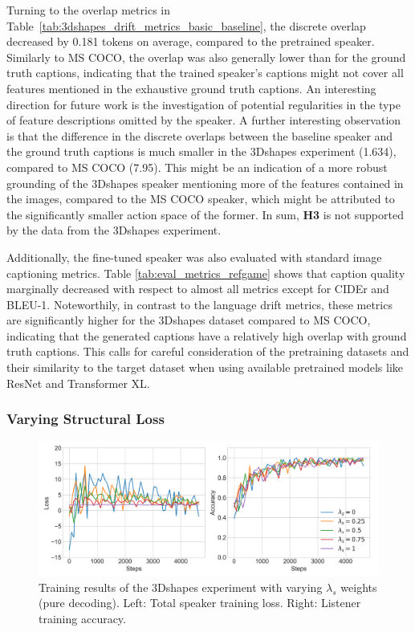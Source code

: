 Turning to the overlap metrics in Table~\ref{tab:3dshapes_drift_metrics_basic_baseline}, the discrete overlap decreased by 0.181 tokens on average, compared to the pretrained speaker. Similarly to MS COCO, the overlap was also generally lower than for the ground truth captions, indicating that the trained speaker's captions might not cover all features mentioned in the exhaustive ground truth captions. An interesting direction for future work is the investigation of potential regularities in the type of feature descriptions omitted by the speaker. A further interesting observation is that the difference in the discrete overlaps between the baseline speaker and the ground truth captions is much smaller in the 3Dshapes experiment (1.634), compared to MS COCO (7.95). This might be an indication of a more robust grounding of the 3Dshapes speaker mentioning more of the features contained in the images, compared to the MS COCO speaker, which might be attributed to the significantly smaller action space of the former. In sum, \textbf{H3} is not supported by the data from the 3Dshapes experiment.


Additionally, the fine-tuned speaker was also evaluated with standard image captioning metrics. Table \ref{tab:eval_metrics_refgame} shows that caption quality marginally decreased with respect to almost all metrics except for CIDEr and BLEU-1. Noteworthily, in contrast to the language drift metrics, these metrics are significantly higher for the 3Dshapes dataset compared to MS COCO, indicating that the generated captions have a relatively high overlap with ground truth captions. This calls for careful consideration of the pretraining datasets and their similarity to the target dataset when using available pretrained models like ResNet and Transformer XL.

\subsubsection{Varying Structural Loss}

\begin{figure}[h]
	\centering
	\includegraphics[width=\linewidth]{images/shapes_refgame_49_pure_losses_all_Ls_random.png}
	\caption{Training results of the 3Dshapes experiment with varying $\lambda_s$ weights (pure decoding). Left: Total speaker training loss. Right: Listener training accuracy.}
	\label{fig:3dshapes_baseline_speaker_loss_listener_acc_all}
\end{figure}


